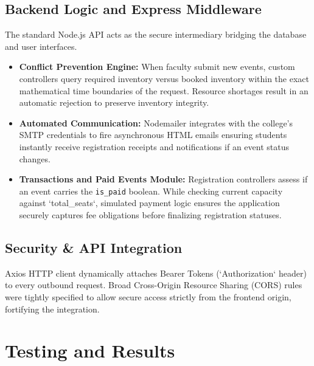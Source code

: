 \documentclass[12pt, a4paper]{report}
\begin{document}
\section{Backend Logic and Express Middleware}
The standard Node.js API acts as the secure intermediary bridging the database and user interfaces.
\begin{itemize}
    \item \textbf{Conflict Prevention Engine:} When faculty submit new events, custom controllers query required inventory versus booked inventory within the exact mathematical time boundaries of the request. Resource shortages result in an automatic rejection to preserve inventory integrity.
    \item \textbf{Automated Communication:} Nodemailer integrates with the college's SMTP credentials to fire asynchronous HTML emails ensuring students instantly receive registration receipts and notifications if an event status changes.
    \item \textbf{Transactions and Paid Events Module:} Registration controllers assess if an event carries the \texttt{is\_paid} boolean. While checking current capacity against `total\_seats`, simulated payment logic ensures the application securely captures fee obligations before finalizing registration statuses.
\end{itemize}

\section{Security \& API Integration}
Axios HTTP client dynamically attaches Bearer Tokens (`Authorization` header) to every outbound request. Broad Cross-Origin Resource Sharing (CORS) rules were tightly specified to allow secure access strictly from the frontend origin, fortifying the integration.

\chapter{Testing and Results}
\end{document}

